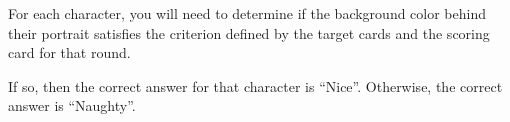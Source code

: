 \documentclass[11pt, parskip=half]{scrartcl}
\begin{document}
For each character, you will need to determine if the background color behind their portrait satisfies the criterion defined by the target cards and the scoring card for that round.

If so, then the correct answer for that character is ``Nice''. Otherwise, the correct answer is ``Naughty''.


\begin{center}
\end{center}
\newpage
\end{document}
